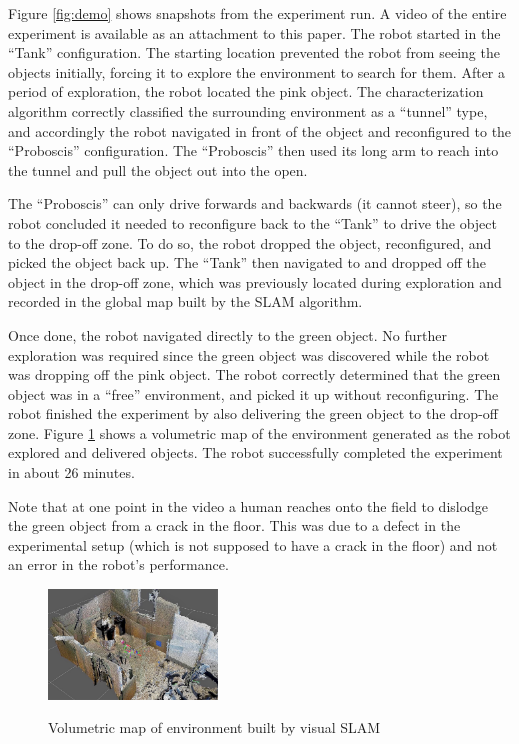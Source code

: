 \documentclass[conference]{IEEEtran}
\begin{document}
%
Figure \ref{fig:demo} shows snapshots from the experiment run. A video of the entire experiment is available as an attachment to this paper. The robot started in the ``Tank'' configuration. The starting location prevented the robot from seeing the objects initially, forcing it to explore the environment to search for them. After a period of exploration, the robot located the pink object. The characterization algorithm correctly classified the surrounding environment as a ``tunnel'' type, and accordingly the robot navigated in front of the object and reconfigured to the ``Proboscis'' configuration. The ``Proboscis'' then used its long arm to reach into the tunnel and pull the object out into the open.

 The ``Proboscis'' can only drive forwards and backwards (it cannot steer), so the robot concluded it needed to reconfigure back to the ``Tank'' to drive the object to the drop-off zone.  To do so, the robot dropped the object,  reconfigured, and picked the object back up. The ``Tank'' then navigated to and dropped off the object in the drop-off zone, which was previously located during exploration and recorded in the global map built by the SLAM algorithm.

 Once done, the robot navigated directly to the green object.  No further exploration was required since the green object was discovered while the robot was dropping off the pink object. The robot correctly determined
that the green object was in a ``free'' environment, and picked it up without reconfiguring. The robot finished the experiment by also delivering the green object to the drop-off zone. Figure \ref{fig:octomap} shows a volumetric map of the environment generated as the robot explored and delivered objects. The robot successfully completed the experiment in about 26 minutes. 

Note that at one point in the video a human reaches onto the field to dislodge the green object from a crack in the floor.  This was due to a defect in the experimental setup (which is not supposed to have a crack in the floor) and not an error in the robot's performance.
%
\begin{figure}
\begin{center}
\includegraphics[width=0.4\textwidth]{images/map4.jpg}
\caption{Volumetric map of environment built by visual SLAM}
\vspace{-2em}
\label{fig:octomap}
\end{center}
\end{figure}
\end{document}
